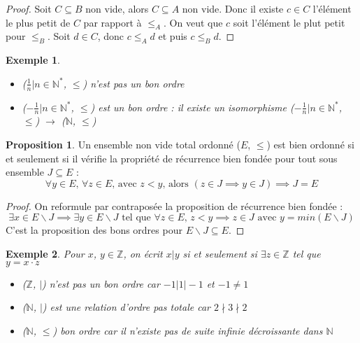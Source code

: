 \documentclass{article}
\theoremstyle{definition}
\theoremstyle{definition}
\newtheorem{prop}{Proposition}
\theoremstyle{definition}
\theoremstyle{plain}
\newtheorem{example}{Exemple}
\theoremstyle{theorem}
\theoremstyle{theorem}
\begin{document}
\begin{proof}

    Soit $C \subseteq B$ non vide, alors $C \subseteq A$ non vide. Donc il existe $c \in C$ l'élément le plus petit de $C$ par rapport à $\leqslant_A$. On
    veut que $c$ soit l'élément le plut petit pour $\leqslant_B$. Soit $d \in C$, donc $c \leqslant_A d$ et puis $c \leqslant_B d$.

\end{proof}

\begin{example}
    \begin{itemize}
        \item (${\frac{1}{n} | n \in \mathbb{N}^*}$, $\leqslant$) n'est pas un bon ordre
        \item (${-\frac{1}{n} | n \in \mathbb{N}^*}$, $\leqslant$) est un bon ordre : il existe un isomorphisme (${-\frac{1}{n} | n \in \mathbb{N}^*}$, $\leqslant$) $\to$ ($\mathbb{N}$, $\leqslant$)
    \end{itemize}
\end{example}

\begin{prop}

    Un ensemble non vide total ordonné ($E$, $\leqslant$) est bien ordonné si et seulement si il vérifie la propriété de récurrence bien fondée pour tout sous ensemble $J \subseteq E$ :
    \begin{equation*}
        \forall y \in E \text{, } \forall z \in E \text{, avec } z < y \text{, alors } (z \in J \implies y \in J) \implies J = E
    \end{equation*}
	\noindent

\end{prop}

\begin{proof}

    On reformule par contraposée la proposition de récurrence bien fondée :
    \begin{equation*}
        \exists x \in E\backslash J \implies \exists y \in E\backslash J \text{ tel que } \forall z \in E \text{, } z < y \implies z \in J \text{ avec } y = min(E\backslash J)
    \end{equation*}
	\noindent
    C'est la proposition des bons ordres pour $E\backslash J \subseteq E$.

\end{proof}

\begin{example}
    Pour $x$, $y \in \mathbb{Z}$, on écrit $x | y$ si et seulement si $\exists z \in \mathbb{Z}$ tel que $y = x\cdot z$
    \begin{itemize}
        \item ($\mathbb{Z}$, $|$) n'est pas un bon ordre car $-1 | 1 | -1$ et $-1 \neq 1$
        \item ($\mathbb{N}$, $|$) est une relation d'ordre pas totale car $2 \nmid 3 \nmid 2$
        \item ($\mathbb{N}$, $\leqslant$) bon ordre car il n'existe pas de suite infinie décroissante dans $\mathbb{N}$
    \end{itemize}
\end{example}
\end{document}
